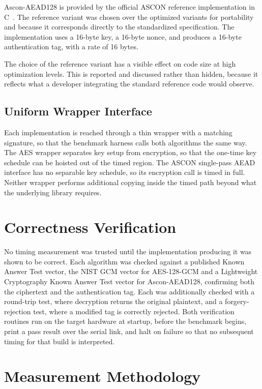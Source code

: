 Ascon-AEAD128 is provided by the official ASCON reference implementation in
C~\cite{ASCONSoftware}.
The reference variant was chosen over the optimized variants for portability and
because it corresponds directly to the standardized specification.
The implementation uses a 16-byte key, a 16-byte nonce, and produces a 16-byte
authentication tag, with a rate of 16 bytes.

The choice of the reference variant has a visible effect on code size at high
optimization levels.
This is reported and discussed rather than hidden, because it reflects what a
developer integrating the standard reference code would observe.

\subsection{Uniform Wrapper Interface}

Each implementation is reached through a thin wrapper with a matching
signature, so that the benchmark harness calls both algorithms the same way.
The AES wrapper separates key setup from encryption, so that the one-time key
schedule can be hoisted out of the timed region.
The ASCON single-pass AEAD interface has no separable key schedule, so its
encryption call is timed in full.
Neither wrapper performs additional copying inside the timed path beyond what
the underlying library requires.

\section{Correctness Verification}

No timing measurement was trusted until the implementation producing it was
shown to be correct.
Each algorithm was checked against a published Known Answer Test vector, the
NIST GCM vector for AES-128-GCM and a Lightweight Cryptography Known Answer Test
vector for Ascon-AEAD128, confirming both the ciphertext and the authentication
tag.
Each was additionally checked with a round-trip test, where decryption returns
the original plaintext, and a forgery-rejection test, where a modified tag is
correctly rejected.
Both verification routines run on the target hardware at startup, before the
benchmark begins, print a pass result over the serial link, and halt on failure
so that no subsequent timing for that build is interpreted.

\section{Measurement Methodology}
\label{sec:timing-source}

